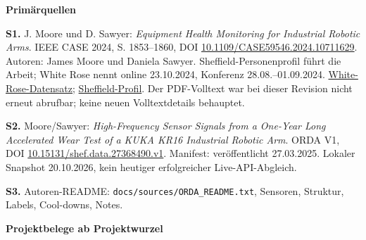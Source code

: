 \documentclass[11pt,a4paper]{article}
\begin{document}
\small
\textbf{Primärquellen}\par
\textbf{S1.} J. Moore und D. Sawyer: \emph{Equipment Health Monitoring for Industrial Robotic Arms}. IEEE CASE 2024, S. 1853--1860, DOI \href{https://doi.org/10.1109/CASE59546.2024.10711629}{10.1109/CASE59546.2024.10711629}. Autoren: James Moore und Daniela Sawyer. Sheffield-Personenprofil führt die Arbeit; White Rose nennt online 23.10.2024, Konferenz 28.08.--01.09.2024. \href{https://eprints.whiterose.ac.uk/id/eprint/213611/}{White-Rose-Datensatz}; \href{https://www.sheffield.ac.uk/amrc/amrc-research-staff/daniela-sawyer}{Sheffield-Profil}. Der PDF-Volltext war bei dieser Revision nicht erneut abrufbar; keine neuen Volltextdetails behauptet.\par
\textbf{S2.} Moore/Sawyer: \emph{High-Frequency Sensor Signals from a One-Year Long Accelerated Wear Test of a KUKA KR16 Industrial Robotic Arm}. ORDA V1, DOI \href{https://doi.org/10.15131/shef.data.27368490.v1}{10.15131/shef.data.27368490.v1}. Manifest: veröffentlicht 27.03.2025. Lokaler Snapshot 20.10.2026, kein heutiger erfolgreicher Live-API-Abgleich.\par
\textbf{S3.} Autoren-README: \texttt{docs/sources/ORDA\_README.txt}, Sensoren, Struktur, Labels, Cool-downs, Notes.\par
\medskip\textbf{Projektbelege ab Projektwurzel}\par
\end{document}
